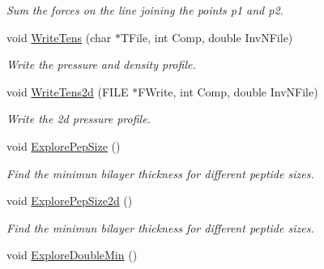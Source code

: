 \begin{DoxyCompactItemize}
\begin{DoxyCompactList}\small\item\em \-Sum the forces on the line joining the points p1 and p2. \end{DoxyCompactList}\item 
\hypertarget{classForces_a0bd0430e9512fea0edf8d3cc157f6e7f}{void \hyperlink{classForces_a0bd0430e9512fea0edf8d3cc157f6e7f}{\-Write\-Tens} (char $\ast$\-T\-File, int \-Comp, double \-Inv\-N\-File)}\label{classForces_a0bd0430e9512fea0edf8d3cc157f6e7f}

\begin{DoxyCompactList}\small\item\em \-Write the pressure and density profile. \end{DoxyCompactList}\item 
\hypertarget{classForces_a7b39177dbabd51bb886537f9674160ba}{void \hyperlink{classForces_a7b39177dbabd51bb886537f9674160ba}{\-Write\-Tens2d} (\-F\-I\-L\-E $\ast$\-F\-Write, int \-Comp, double \-Inv\-N\-File)}\label{classForces_a7b39177dbabd51bb886537f9674160ba}

\begin{DoxyCompactList}\small\item\em \-Write the 2d pressure profile. \end{DoxyCompactList}\item 
\hypertarget{classForces_a49654bba62557156b6599f4875484078}{void \hyperlink{classForces_a49654bba62557156b6599f4875484078}{\-Explore\-Pep\-Size} ()}\label{classForces_a49654bba62557156b6599f4875484078}

\begin{DoxyCompactList}\small\item\em \-Find the minimun bilayer thickness for different peptide sizes. \end{DoxyCompactList}\item 
\hypertarget{classForces_a9ebbcc00e2ef112a3739e90118698f80}{void \hyperlink{classForces_a9ebbcc00e2ef112a3739e90118698f80}{\-Explore\-Pep\-Size2d} ()}\label{classForces_a9ebbcc00e2ef112a3739e90118698f80}

\begin{DoxyCompactList}\small\item\em \-Find the minimun bilayer thickness for different peptide sizes. \end{DoxyCompactList}\item 
\hypertarget{classForces_a3efc71eff5d768421c05dc9f9ef801d1}{void \hyperlink{classForces_a3efc71eff5d768421c05dc9f9ef801d1}{\-Explore\-Double\-Min} ()}\label{classForces_a3efc71eff5d768421c05dc9f9ef801d1}


\end{DoxyCompactItemize}
